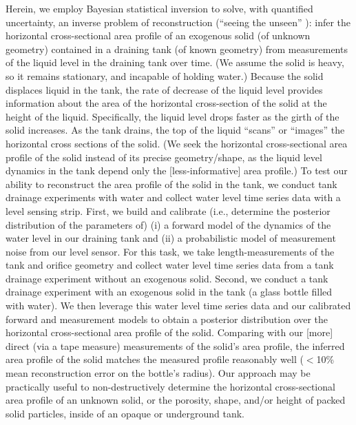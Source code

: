 \documentclass[a4paper,fleqn]{cas-dc}
\begin{document}
Herein, we employ Bayesian statistical inversion \cite{calvetti2018inverse,waqar2023tutorial,kaipio2006statistical,dashti2013bayesian} to solve, with quantified uncertainty, an inverse problem of reconstruction (``seeing the unseen'' \cite{uhlmann2014inverse}): infer the horizontal cross-sectional area profile of an exogenous solid (of unknown geometry) contained in a draining tank (of known geometry) from measurements of the liquid level in the draining tank over time. 
(We assume the solid is heavy, so it remains stationary, and incapable of holding water.)
Because the solid displaces liquid in the tank, the rate of decrease of the liquid level provides information about the area of the horizontal cross-section of the solid at the height of the liquid. Specifically, the liquid level drops faster as the girth of the solid increases. 
As the tank drains, the top of the liquid ``scans'' or ``images'' the horizontal cross sections of the solid.
(We seek the horizontal cross-sectional area profile of the solid instead of its precise geometry/shape, as the liquid level dynamics in the tank depend only the [less-informative] area profile.)
To test our ability to reconstruct the area profile of the solid in the tank, we conduct tank drainage experiments with water and collect water level time series data with a level sensing strip. 
First, we build and calibrate (i.e., determine the posterior distribution of the parameters of) (i) a forward model of the dynamics of the water level in our draining tank and (ii) a probabilistic model of measurement noise from our level sensor.
For this task, we take length-measurements of the tank and orifice geometry and collect water level time series data from a tank drainage experiment without an exogenous solid. 
Second, we conduct a tank drainage experiment with an exogenous solid in the tank (a glass bottle filled with water). We then leverage this water level time series data and our calibrated forward and measurement models to obtain a posterior distribution over the horizontal cross-sectional area profile of the solid.
Comparing with our [more] direct (via a tape measure) measurements of the solid's area profile, the inferred area profile of the solid matches the measured profile reasonably well ($<$10\% mean reconstruction error on the bottle's radius). Our approach may be practically useful to non-destructively determine the horizontal cross-sectional area profile of an unknown solid, or the porosity, shape, and/or height of packed solid particles, inside of an opaque or underground tank.
\end{document}

